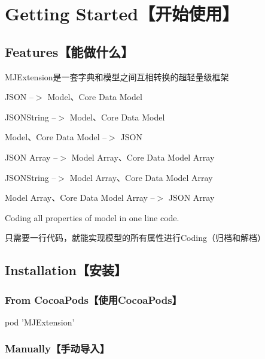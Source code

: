 \section*{Getting Started【开始使用】}

\subsection*{Features【能做什么】}


\begin{DoxyItemize}
\item M\+J\+Extension是一套字典和模型之间互相转换的超轻量级框架
\item {\ttfamily J\+S\+ON} --$>$ {\ttfamily Model}、{\ttfamily Core Data Model}
\item {\ttfamily J\+S\+O\+N\+String} --$>$ {\ttfamily Model}、{\ttfamily Core Data Model}
\item {\ttfamily Model}、{\ttfamily Core Data Model} --$>$ {\ttfamily J\+S\+ON}
\item {\ttfamily J\+S\+ON Array} --$>$ {\ttfamily Model Array}、{\ttfamily Core Data Model Array}
\item {\ttfamily J\+S\+O\+N\+String} --$>$ {\ttfamily Model Array}、{\ttfamily Core Data Model Array}
\item {\ttfamily Model Array}、{\ttfamily Core Data Model Array} --$>$ {\ttfamily J\+S\+ON Array}
\item Coding all properties of model in one line code.
\begin{DoxyItemize}
\item 只需要一行代码，就能实现模型的所有属性进行\+Coding（归档和解档）
\end{DoxyItemize}
\end{DoxyItemize}

\subsection*{Installation【安装】}

\subsubsection*{From Cocoa\+Pods【使用\+Cocoa\+Pods】}


\begin{DoxyCode}
pod 'MJExtension'
\end{DoxyCode}


\subsubsection*{Manually【手动导入】}


